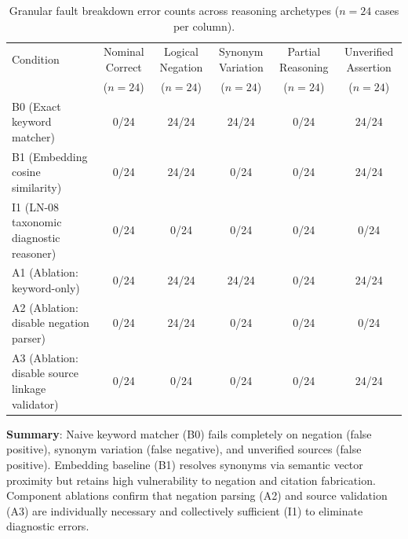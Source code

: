 \begin{table}[t]
\centering
\small
\caption{Granular fault breakdown error counts across reasoning archetypes ($n=24$ cases per column).}
\label{tab:ln08-fault-breakdown}
\begin{tabular}{lccccc}
\toprule
Condition & Nominal Correct & Logical Negation & Synonym Variation & Partial Reasoning & Unverified Assertion \\
 & ($n=24$) & ($n=24$) & ($n=24$) & ($n=24$) & ($n=24$) \\
\midrule
B0 (Exact keyword matcher) & 0/24 & 24/24 & 24/24 & 0/24 & 24/24 \\
B1 (Embedding cosine similarity) & 0/24 & 24/24 & 0/24 & 0/24 & 24/24 \\
I1 (LN-08 taxonomic diagnostic reasoner) & 0/24 & 0/24 & 0/24 & 0/24 & 0/24 \\
A1 (Ablation: keyword-only) & 0/24 & 24/24 & 24/24 & 0/24 & 24/24 \\
A2 (Ablation: disable negation parser) & 0/24 & 24/24 & 0/24 & 0/24 & 0/24 \\
A3 (Ablation: disable source linkage validator) & 0/24 & 0/24 & 0/24 & 0/24 & 24/24 \\
\bottomrule
\end{tabular}
\par\smallskip
\begin{minipage}{0.98\linewidth}\footnotesize
\textbf{Summary}: Naive keyword matcher (B0) fails completely on negation (false positive), synonym variation (false negative), and unverified sources (false positive). Embedding baseline (B1) resolves synonyms via semantic vector proximity but retains high vulnerability to negation and citation fabrication. Component ablations confirm that negation parsing (A2) and source validation (A3) are individually necessary and collectively sufficient (I1) to eliminate diagnostic errors.
\end{minipage}
\end{table}
